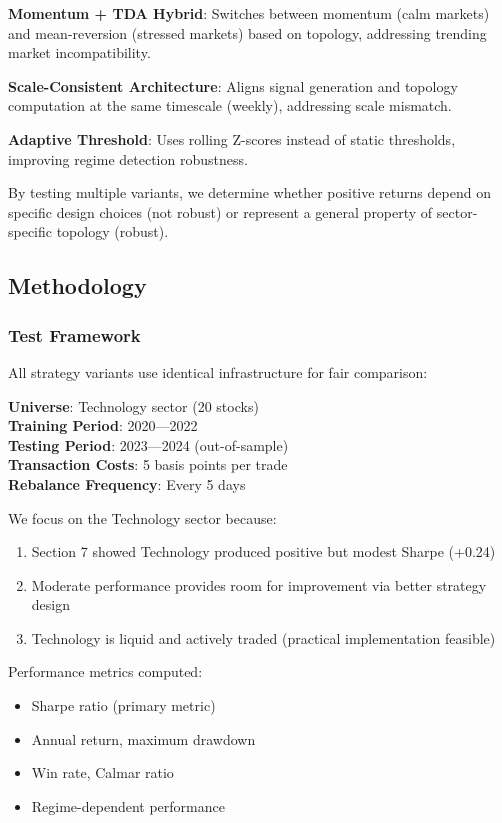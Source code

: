 \textbf{Momentum + TDA Hybrid}: Switches between momentum (calm markets) and mean-reversion (stressed markets) based on topology, addressing trending market incompatibility.

\textbf{Scale-Consistent Architecture}: Aligns signal generation and topology computation at the same timescale (weekly), addressing scale mismatch.

\textbf{Adaptive Threshold}: Uses rolling Z-scores instead of static thresholds, improving regime detection robustness.

By testing multiple variants, we determine whether positive returns depend on specific design choices (not robust) or represent a general property of sector-specific topology (robust).

\subsection{Methodology}

\subsubsection{Test Framework}

All strategy variants use identical infrastructure for fair comparison:

\textbf{Universe}: Technology sector (20 stocks) \\
\textbf{Training Period}: 2020---2022 \\
\textbf{Testing Period}: 2023---2024 (out-of-sample) \\
\textbf{Transaction Costs}: 5 basis points per trade \\
\textbf{Rebalance Frequency}: Every 5 days

We focus on the Technology sector because:
\begin{enumerate}
\item Section 7 showed Technology produced positive but modest Sharpe (+0.24)
\item Moderate performance provides room for improvement via better strategy design
\item Technology is liquid and actively traded (practical implementation feasible)
\end{enumerate}

Performance metrics computed:
\begin{itemize}
\item Sharpe ratio (primary metric)
\item Annual return, maximum drawdown
\item Win rate, Calmar ratio
\item Regime-dependent performance
\end{itemize}

